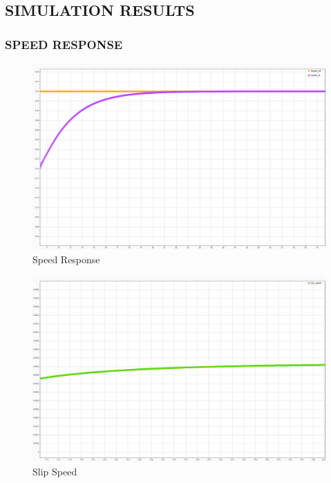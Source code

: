 \subsection{SIMULATION RESULTS}

\subsubsection{SPEED RESPONSE}

\begin{figure}[H]
	\centering
	\includegraphics[width=6in]{sections/section3/images/simulationResutls/SpeedTrackingNoCursor.png}
	\caption{Speed Response}
	\label{fig:speed_response}
\end{figure}


\begin{figure}[H]
	\centering
	\includegraphics[width=6in]{sections/section3/images/simulationResutls/SlipSpeed.png}
	\caption{Slip Speed}
	\label{fig:slip_speed}
\end{figure}


